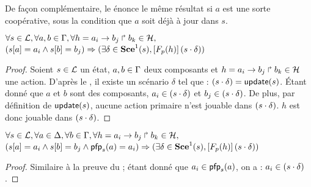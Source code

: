 De façon complémentaire, le  énonce le même résultat si $a$ est une sorte coopérative,
sous la condition que $a$ soit déjà à jour dans $s$.

\begin{lemma}
  $\forall s \in \mathcal{L}, \forall a,b \in \Gamma, \forall h = a_i\rightarrow b_j\Rsh b_k \in \mathcal{H},$\\
  $({s[a]} = a_i \wedge {s[b]} = b_j) \Rightarrow
    (\exists \delta \in \mathbf{Sce}^1(s),
    \left[F_{p}(h)\right](s \cdot \delta))$
\end{lemma}

\begin{proof} %
  Soient $s \in \mathcal{L}$ un état, $a,b \in \Gamma$ deux composants et
  $h = a_i\rightarrow b_j\Rsh b_k \in \mathcal{H}$ une action.
  D'après le , il existe un scénario $\delta$ tel que :
  $(s \cdot \delta) = \mathsf{update}(s)$.
  Étant donné que $a$ et $b$ sont des composants,
  $a_i \in (s \cdot \delta)$ et $b_j \in (s \cdot \delta)$.
  De plus, par définition de $\mathsf{update}(s)$, aucune action primaire n'est jouable
  dans $(s \cdot \delta)$.
  $h$ est donc jouable dans $(s \cdot \delta)$.
\end{proof}

\begin{lemma}
  $\forall s \in \mathcal{L}, \forall a \in \Delta, \forall b \in \Gamma,
    \forall h = a_i\rightarrow b_j\Rsh b_k \in \mathcal{H},$\\
  $({s[a]} = a_i \wedge {s[b]} = b_j \wedge \mathsf{pfp}_s(a) = a_i) \Rightarrow
    (\exists \delta \in \mathbf{Sce}^1(s),
    \left[F_{p}(h)\right](s \cdot \delta))$
\end{lemma}

\begin{proof} %
  Similaire à la preuve du  ;
  étant donné que $a_i \in \mathsf{pfp}_s(a)$, on a : $a_i \in (s \cdot \delta)$.
\end{proof}
